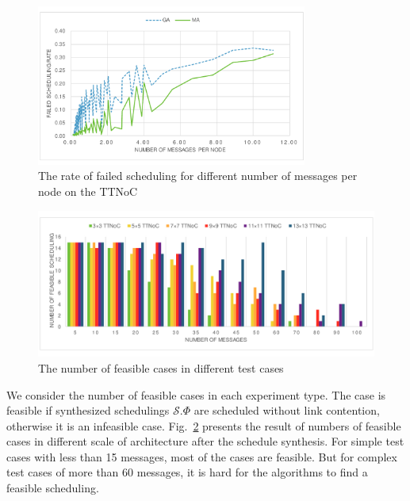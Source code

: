 \documentclass[10pt,journal]{IEEEtran}
\newcommand{\calS}{\mathcal{S}}
\theoremstyle{remark}
\begin{document}
\begin{figure}[!t]
	\centering
	\includegraphics[width=3.5in]{picture/dencity}
	\caption{The rate of failed scheduling for different number of messages per node on the TTNoC}
	\label{f:dencity}
\end{figure}
\begin{figure}[!t]
	\centering
	\includegraphics[width=3.5 in]{picture/feasible_case}
	\caption{The number of feasible cases in different test cases}
	\label{f:feasible}
\end{figure}

We consider the number of feasible cases in each experiment type.
The case is feasible if synthesized schedulings $\calS.\Phi$ are scheduled without link contention,
 otherwise it is an infeasible case.
Fig.~\ref{f:feasible} presents the result of numbers of feasible cases in different scale of architecture after the schedule synthesis.
For simple test cases with less than 15 messages,
 most of the cases are feasible.
But for complex test cases of more than 60 messages, it is hard for the algorithms to find a feasible scheduling.
\end{document}
